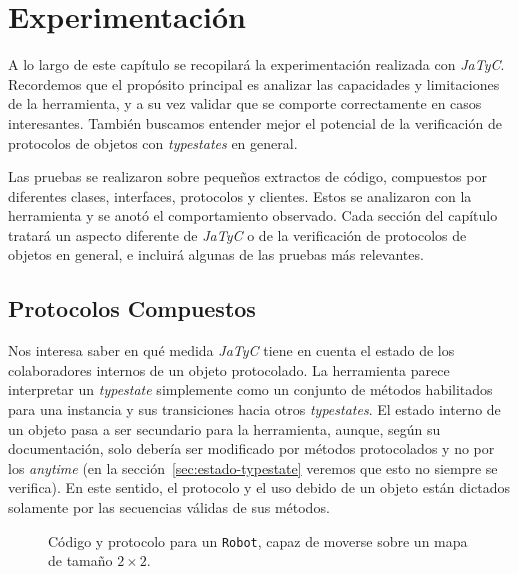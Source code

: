\chapter{Experimentación}

A lo largo de este capítulo se recopilará la experimentación realizada con \textit{JaTyC}. Recordemos que el propósito principal es analizar las capacidades y limitaciones de la herramienta, y a su vez validar que se comporte correctamente en casos interesantes. También buscamos entender mejor el potencial de la verificación de protocolos de objetos con \textit{typestates} en general.

Las pruebas se realizaron sobre pequeños extractos de código, compuestos por diferentes clases, interfaces, protocolos y clientes. Estos se analizaron con la herramienta y se anotó el comportamiento observado. Cada sección del capítulo tratará un aspecto diferente de \textit{JaTyC} o de la verificación de protocolos de objetos en general, e incluirá algunas de las pruebas más relevantes.

\section{Protocolos Compuestos}

Nos interesa saber en qué medida \textit{JaTyC} tiene en cuenta el estado de los colaboradores internos de un objeto protocolado. La herramienta parece interpretar un \textit{typestate} simplemente como un conjunto de métodos habilitados para una instancia y sus transiciones hacia otros \textit{typestates}. El estado interno de un objeto pasa a ser secundario para la herramienta, aunque, según su documentación, solo debería ser modificado por métodos protocolados y no por los \textit{anytime} (en la sección~\ref{sec:estado-typestate} veremos que esto no siempre se verifica). En este sentido, el protocolo y el uso debido de un objeto están dictados solamente por las secuencias válidas de sus métodos.

\begin{figure}[htbp]
\centering
\begin{minipage}[t]{0.50\textwidth}
    
\end{minipage}
\hfill
\begin{minipage}[t]{0.46\textwidth}
    
\end{minipage}
\caption{Código y protocolo para un \texttt{Robot}, capaz de moverse sobre un mapa de tamaño $2\times2$.}
\label{exp:compound-1:robot}
\end{figure}


